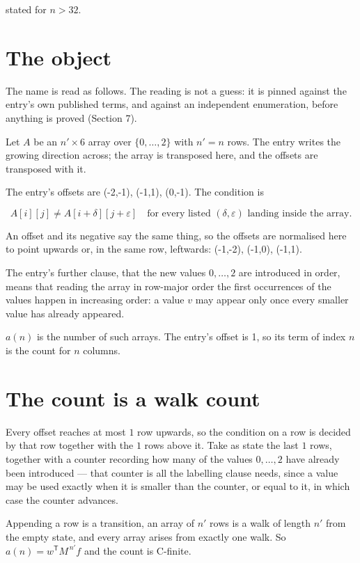 \documentclass[11pt]{article}
\theoremstyle{definition}
\begin{document}
stated for $n > 32$.

\section{The object}

The name is read as follows. The reading is not a guess: it is pinned against the entry's own published terms, and against an independent enumeration, before anything is proved (Section 7).

Let $A$ be an $n' \times 6$ array over $\{0,\dots,2\}$ with $n' = n$ rows. The entry writes the growing direction across; the array is transposed here, and the offsets are transposed with it.

The entry's offsets are (-2,-1), (-1,1), (0,-1). The condition is

\[A[i][j] \ne A[i{+}\delta][j{+}\varepsilon]\quad\text{for every listed }(\delta,\varepsilon)\text{ landing inside the array.}\]

An offset and its negative say the same thing, so the offsets are normalised here to point upwards or, in the same row, leftwards: (-1,-2), (-1,0), (-1,1).

The entry's further clause, that the new values $0,\dots,2$ are introduced in order, means that reading the array in row-major order the first occurrences of the values happen in increasing order: a value $v$ may appear only once every smaller value has already appeared.

$a(n)$ is the number of such arrays. The entry's offset is 1, so its term of index $n$ is the count for $n$ columns.

\section{The count is a walk count}

Every offset reaches at most $1$ row upwards, so the condition on a row is decided by that row together with the $1$ rows above it. Take as state the last $1$ rows, together with a counter recording how many of the values $0,\dots,2$ have already been introduced --- that counter is all the labelling clause needs, since a value may be used exactly when it is smaller than the counter, or equal to it, in which case the counter advances.

Appending a row is a transition, an array of $n'$ rows is a walk of length $n'$ from the empty state, and every array arises from exactly one walk. So $a(n) = w^{\mathsf T}M^{\,n'}f$ and the count is C-finite.
\end{document}
